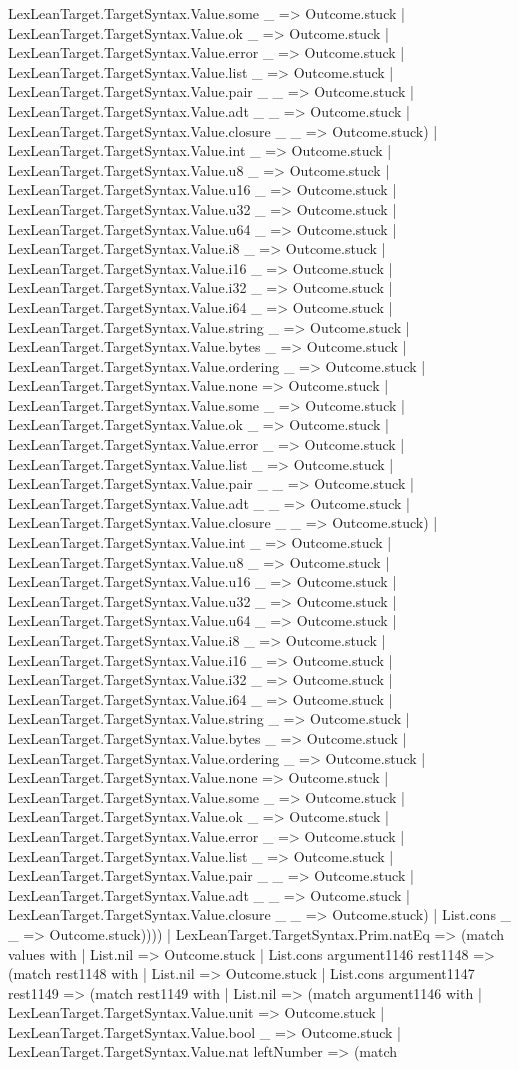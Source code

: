 \documentclass[11pt]{article}
\begin{document}
LexLeanTarget.TargetSyntax.Value.some \_ => Outcome.stuck | LexLeanTarget.TargetSyntax.Value.ok \_ => Outcome.stuck | LexLeanTarget.TargetSyntax.Value.error \_ => Outcome.stuck | LexLeanTarget.TargetSyntax.Value.list \_ => Outcome.stuck | LexLeanTarget.TargetSyntax.Value.pair \_ \_ => Outcome.stuck | LexLeanTarget.TargetSyntax.Value.adt \_ \_ => Outcome.stuck | LexLeanTarget.TargetSyntax.Value.closure \_ \_ => Outcome.stuck) | LexLeanTarget.TargetSyntax.Value.int \_ => Outcome.stuck | LexLeanTarget.TargetSyntax.Value.u8 \_ => Outcome.stuck | LexLeanTarget.TargetSyntax.Value.u16 \_ => Outcome.stuck | LexLeanTarget.TargetSyntax.Value.u32 \_ => Outcome.stuck | LexLeanTarget.TargetSyntax.Value.u64 \_ => Outcome.stuck | LexLeanTarget.TargetSyntax.Value.i8 \_ => Outcome.stuck | LexLeanTarget.TargetSyntax.Value.i16 \_ => Outcome.stuck | LexLeanTarget.TargetSyntax.Value.i32 \_ => Outcome.stuck | LexLeanTarget.TargetSyntax.Value.i64 \_ => Outcome.stuck | LexLeanTarget.TargetSyntax.Value.string \_ => Outcome.stuck | LexLeanTarget.TargetSyntax.Value.bytes \_ => Outcome.stuck | LexLeanTarget.TargetSyntax.Value.ordering \_ => Outcome.stuck | LexLeanTarget.TargetSyntax.Value.none => Outcome.stuck | LexLeanTarget.TargetSyntax.Value.some \_ => Outcome.stuck | LexLeanTarget.TargetSyntax.Value.ok \_ => Outcome.stuck | LexLeanTarget.TargetSyntax.Value.error \_ => Outcome.stuck | LexLeanTarget.TargetSyntax.Value.list \_ => Outcome.stuck | LexLeanTarget.TargetSyntax.Value.pair \_ \_ => Outcome.stuck | LexLeanTarget.TargetSyntax.Value.adt \_ \_ => Outcome.stuck | LexLeanTarget.TargetSyntax.Value.closure \_ \_ => Outcome.stuck) | LexLeanTarget.TargetSyntax.Value.int \_ => Outcome.stuck | LexLeanTarget.TargetSyntax.Value.u8 \_ => Outcome.stuck | LexLeanTarget.TargetSyntax.Value.u16 \_ => Outcome.stuck | LexLeanTarget.TargetSyntax.Value.u32 \_ => Outcome.stuck | LexLeanTarget.TargetSyntax.Value.u64 \_ => Outcome.stuck | LexLeanTarget.TargetSyntax.Value.i8 \_ => Outcome.stuck | LexLeanTarget.TargetSyntax.Value.i16 \_ => Outcome.stuck | LexLeanTarget.TargetSyntax.Value.i32 \_ => Outcome.stuck | LexLeanTarget.TargetSyntax.Value.i64 \_ => Outcome.stuck | LexLeanTarget.TargetSyntax.Value.string \_ => Outcome.stuck | LexLeanTarget.TargetSyntax.Value.bytes \_ => Outcome.stuck | LexLeanTarget.TargetSyntax.Value.ordering \_ => Outcome.stuck | LexLeanTarget.TargetSyntax.Value.none => Outcome.stuck | LexLeanTarget.TargetSyntax.Value.some \_ => Outcome.stuck | LexLeanTarget.TargetSyntax.Value.ok \_ => Outcome.stuck | LexLeanTarget.TargetSyntax.Value.error \_ => Outcome.stuck | LexLeanTarget.TargetSyntax.Value.list \_ => Outcome.stuck | LexLeanTarget.TargetSyntax.Value.pair \_ \_ => Outcome.stuck | LexLeanTarget.TargetSyntax.Value.adt \_ \_ => Outcome.stuck | LexLeanTarget.TargetSyntax.Value.closure \_ \_ => Outcome.stuck) | List.cons \_ \_ => Outcome.stuck)))) | LexLeanTarget.TargetSyntax.Prim.natEq => (match values with | List.nil => Outcome.stuck | List.cons argument1146 rest1148 => (match rest1148 with | List.nil => Outcome.stuck | List.cons argument1147 rest1149 => (match rest1149 with | List.nil => (match argument1146 with | LexLeanTarget.TargetSyntax.Value.unit => Outcome.stuck | LexLeanTarget.TargetSyntax.Value.bool \_ => Outcome.stuck | LexLeanTarget.TargetSyntax.Value.nat leftNumber => (match 
\end{document}
